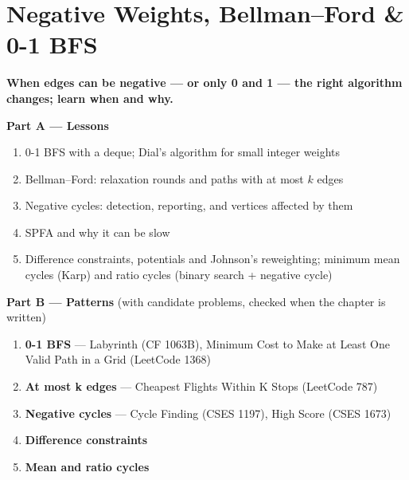 \chapter{Negative Weights, Bellman--Ford \& 0-1 BFS}
\label{ch:negative_weights}

\begin{tcolorbox}[enhanced, colback=white, colframe=secondaryblue, boxrule=1pt, arc=2mm]
\textbf{\large\textcolor{primaryblue}{When edges can be negative --- or only 0 and 1 --- the right algorithm changes; learn when and why.}}
\end{tcolorbox}


\begin{plannedbox}
\textbf{Part A --- Lessons}
\begin{enumerate}[leftmargin=*, label=\textbf{A\arabic*.}, itemsep=1pt]
    \item 0-1 BFS with a deque; Dial's algorithm for small integer weights
    \item Bellman--Ford: relaxation rounds and paths with at most $k$ edges
    \item Negative cycles: detection, reporting, and vertices affected by them
    \item SPFA and why it can be slow
    \item Difference constraints, potentials and Johnson's reweighting; minimum mean cycles (Karp) and ratio cycles (binary search + negative cycle)
\end{enumerate}
\textbf{Part B --- Patterns} (with candidate problems, checked when the chapter is written)
\begin{enumerate}[leftmargin=*, label=\textbf{P\arabic*.}, itemsep=1pt]
    \item \textbf{0-1 BFS} --- Labyrinth {\small\color{darkgray}(CF 1063B)}, Minimum Cost to Make at Least One Valid Path in a Grid {\small\color{darkgray}(LeetCode 1368)}
    \item \textbf{At most k edges} --- Cheapest Flights Within K Stops {\small\color{darkgray}(LeetCode 787)}
    \item \textbf{Negative cycles} --- Cycle Finding {\small\color{darkgray}(CSES 1197)}, High Score {\small\color{darkgray}(CSES 1673)}
    \item \textbf{Difference constraints}
    \item \textbf{Mean and ratio cycles}
\end{enumerate}
\end{plannedbox}
